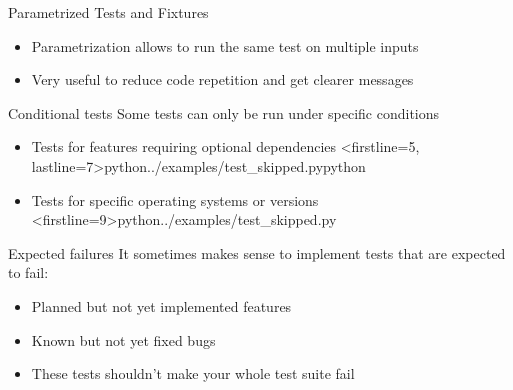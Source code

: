 \begin{frame}[c]{Parametrized Tests and Fixtures}
  \begin{itemize}
    \item Parametrization allows to run the same test on multiple inputs
    \item Very useful to reduce code repetition and get clearer messages
  \end{itemize}

\end{frame}


\begin{frame}[c, fragile]{Conditional tests}
  Some tests can only be run under specific conditions
    \begin{itemize}
      \item Tests for features requiring optional dependencies
        <firstline=5, lastline=7>{python}{../examples/test_skipped.py}{python}
      \item Tests for specific operating systems or versions
        <firstline=9>{python}{../examples/test_skipped.py}
    \end{itemize}
\end{frame}

\begin{frame}[c, fragile]{Expected failures}
  It sometimes makes sense to implement tests that are expected to fail:
  \begin{itemize}
    \item Planned but not yet implemented features
    \item Known but not yet fixed bugs
    \item These tests shouldn't make your whole test suite fail
  \end{itemize}

\end{frame}

